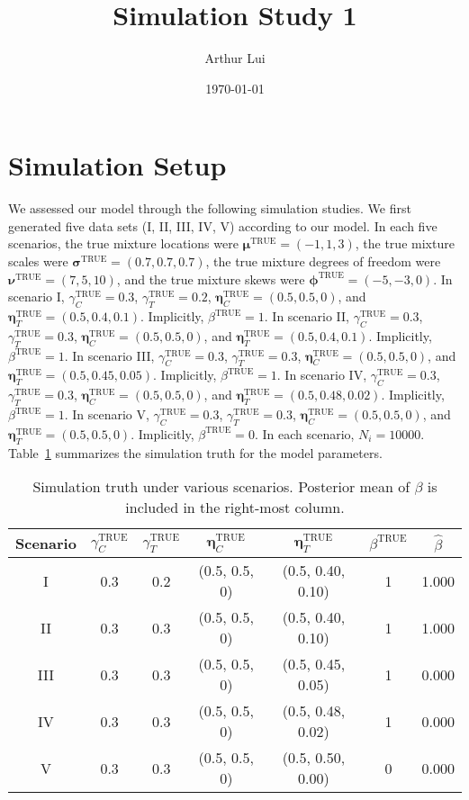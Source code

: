 \documentclass[12pt]{article} %
\title{Simulation Study 1}
\author{Arthur Lui}
\date{\today} %
\newcommand{\true}{\text{TRUE}}
\begin{document}
\maketitle

\section{Simulation Setup}\label{sec:sim-setup}
We assessed our model through the following simulation studies. We first
generated five data sets (I, II, III, IV, V) according to our model. In each
five scenarios,
%
the true mixture locations were $\bm{\mu}^\true=(-1, 1, 3)$,
the true mixture scales were $\bm{\sigma}^\true=(0.7, 0.7, 0.7)$,
the true mixture degrees of freedom were $\bm{\nu}^\true=(7, 5, 10)$, and
the true mixture skews were $\bm{\phi}^\true=(-5, -3, 0)$.
%
In scenario I, $\gamma_C^\true=0.3$, $\gamma_T^\true=0.2$, $\bm\eta_C^\true=(0.5,
0.5, 0)$, and $\bm\eta_T^\true=(0.5,0.4,0.1)$. Implicitly, $\beta^\true=1$.
In scenario II, $\gamma_C^\true=0.3$, $\gamma_T^\true=0.3$, $\bm\eta_C^\true=(0.5,
0.5, 0)$, and $\bm\eta_T^\true=(0.5,0.4,0.1)$. Implicitly, $\beta^\true=1$.
In scenario III, $\gamma_C^\true=0.3$, $\gamma_T^\true=0.3$, $\bm\eta_C^\true=(0.5,
0.5, 0)$, and $\bm\eta_T^\true=(0.5,0.45,0.05)$. Implicitly, $\beta^\true=1$.
In scenario IV, $\gamma_C^\true=0.3$, $\gamma_T^\true=0.3$, $\bm\eta_C^\true=(0.5,
0.5, 0)$, and $\bm\eta_T^\true=(0.5,0.48,0.02)$. Implicitly, $\beta^\true=1$.
In scenario V, $\gamma_C^\true=0.3$, $\gamma_T^\true=0.3$, $\bm\eta_C^\true=(0.5,
0.5, 0)$, and $\bm\eta_T^\true=(0.5,0.5,0)$. Implicitly, $\beta^\true=0$.
%
In each scenario, $N_i=10000$. Table~\ref{tab:sim-truth} summarizes the
simulation truth for the model parameters.
\begin{table}
  \centering
  \begin{tabular}{|c|cccccc|}
    \hline 
    Scenario & $\gamma_C^\true$ & $\gamma_T^\true$ & $\bm\eta_C^\true$ & 
    $\bm\eta_T^\true$ & $\beta^\true$ & $\hat\beta$ \\
    \hline 
    I   & 0.3 & 0.2 & (0.5, 0.5, 0) & (0.5, 0.40, 0.10) & 1 & 1.000 \\
    II  & 0.3 & 0.3 & (0.5, 0.5, 0) & (0.5, 0.40, 0.10) & 1 & 1.000 \\
    III & 0.3 & 0.3 & (0.5, 0.5, 0) & (0.5, 0.45, 0.05) & 1 & 0.000 \\
    IV  & 0.3 & 0.3 & (0.5, 0.5, 0) & (0.5, 0.48, 0.02) & 1 & 0.000 \\
    V   & 0.3 & 0.3 & (0.5, 0.5, 0) & (0.5, 0.50, 0.00) & 0 & 0.000 \\
    \hline
  \end{tabular}
  \caption{Simulation truth under various scenarios. Posterior mean of
  $\beta$ is included in the right-most column.}
  \label{tab:sim-truth}
\end{table}
\end{document}
